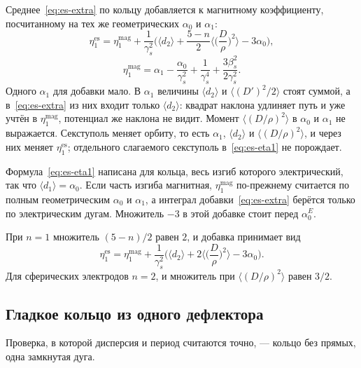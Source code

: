 Среднее~\eqref{eq:es-extra} по кольцу добавляется к магнитному коэффициенту, посчитанному на тех же геометрических $\alpha_0$ и $\alpha_1$:
\begin{equation}
\label{eq:es-eta1}
\eta_1^{\mathrm{es}}
=\eta_1^{\mathrm{mag}}
+\frac{1}{\gamma_s^2}
\Biggl(
\langle d_2\rangle
+\frac{5-n}{2}\Biggl\langle\Biggl(\frac{D}{\rho}\Biggr)^2\Biggr\rangle
-3\alpha_0
\Biggr),
\end{equation}
\begin{equation}
\label{eq:es-eta1mag}
\eta_1^{\mathrm{mag}}
=\alpha_1-\frac{\alpha_0}{\gamma_s^2}+\frac{1}{\gamma_s^4}+\frac{3\beta_s^2}{2\gamma_s^2}.
\end{equation}
Одного $\alpha_1$ для добавки мало. В $\alpha_1$ величины $\langle d_2\rangle$ и $\langle(D')^2/2\rangle$ стоят суммой, а в~\eqref{eq:es-extra} из них входит только $\langle d_2\rangle$: квадрат наклона удлиняет путь и уже учтён в $\eta_1^{\mathrm{mag}}$, потенциал же наклона не видит. Момент $\langle(D/\rho)^2\rangle$ в $\alpha_0$ и $\alpha_1$ не выражается. Секступоль меняет орбиту, то есть $\alpha_1$, $\langle d_2\rangle$ и $\langle(D/\rho)^2\rangle$, и через них меняет $\eta_1^{\mathrm{es}}$; отдельного слагаемого секступоль в~\eqref{eq:es-eta1} не порождает.

Формула~\eqref{eq:es-eta1} написана для кольца, весь изгиб которого электрический, так что $\langle d_1\rangle=\alpha_0$. Если часть изгиба магнитная, $\eta_1^{\mathrm{mag}}$ по-прежнему считается по полным геометрическим $\alpha_0$ и $\alpha_1$, а интеграл добавки~\eqref{eq:es-extra} берётся только по электрическим дугам. Множитель $-3$ в этой добавке стоит перед $\alpha_0^{E}$.

При $n=1$ множитель $(5-n)/2$ равен $2$, и добавка принимает вид
\begin{equation}
\label{eq:es-eta1c}
\eta_1^{\mathrm{es}}
=\eta_1^{\mathrm{mag}}
+\frac{1}{\gamma_s^2}
\Biggl(
\langle d_2\rangle
+2\Biggl\langle\Biggl(\frac{D}{\rho}\Biggr)^2\Biggr\rangle
-3\alpha_0
\Biggr).
\end{equation}
Для сферических электродов $n=2$, и множитель при $\langle(D/\rho)^2\rangle$ равен $3/2$.

\subsection{Гладкое кольцо из одного дефлектора}
\label{sec:es-smooth}

Проверка, в которой дисперсия и период считаются точно, --- кольцо без прямых, одна замкнутая дуга.

